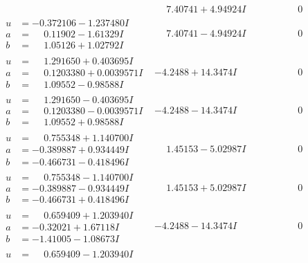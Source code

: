 \documentclass[1p]{elsarticle_modified}
\theoremstyle{definition}
\begin{document}
$$\begin{array}{c|c|c}
 & \phantom{-}7.40741 + 4.94924 I & \phantom{-0.000000 } 0 \\ \hline\begin{aligned}
u &= -0.372106 - 1.237480 I \\
a &= \phantom{-}0.11902 - 1.61329 I \\
b &= \phantom{-}1.05126 + 1.02792 I\end{aligned}
 & \phantom{-}7.40741 - 4.94924 I & \phantom{-0.000000 } 0 \\ \hline\begin{aligned}
u &= \phantom{-}1.291650 + 0.403695 I \\
a &= \phantom{-}0.1203380 + 0.0039571 I \\
b &= \phantom{-}1.09552 - 0.98588 I\end{aligned}
 & -4.2488 + 14.3474 I & \phantom{-0.000000 } 0 \\ \hline\begin{aligned}
u &= \phantom{-}1.291650 - 0.403695 I \\
a &= \phantom{-}0.1203380 - 0.0039571 I \\
b &= \phantom{-}1.09552 + 0.98588 I\end{aligned}
 & -4.2488 - 14.3474 I & \phantom{-0.000000 } 0 \\ \hline\begin{aligned}
u &= \phantom{-}0.755348 + 1.140700 I \\
a &= -0.389887 + 0.934449 I \\
b &= -0.466731 - 0.418496 I\end{aligned}
 & \phantom{-}1.45153 - 5.02987 I & \phantom{-0.000000 } 0 \\ \hline\begin{aligned}
u &= \phantom{-}0.755348 - 1.140700 I \\
a &= -0.389887 - 0.934449 I \\
b &= -0.466731 + 0.418496 I\end{aligned}
 & \phantom{-}1.45153 + 5.02987 I & \phantom{-0.000000 } 0 \\ \hline\begin{aligned}
u &= \phantom{-}0.659409 + 1.203940 I \\
a &= -0.32021 + 1.67118 I \\
b &= -1.41005 - 1.08673 I\end{aligned}
 & -4.2488 - 14.3474 I & \phantom{-0.000000 } 0 \\ \hline\begin{aligned}
u &= \phantom{-}0.659409 - 1.203940 I \\

\end{aligned}
\end{array}$$
\end{document}
